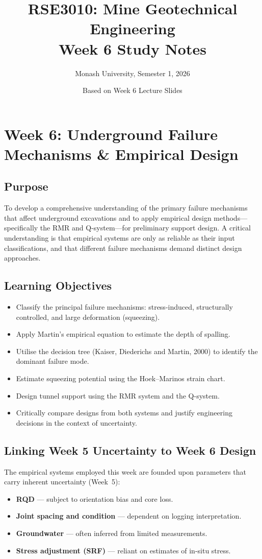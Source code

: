 \documentclass[a4paper,12pt]{article}
\title{\textbf{RSE3010: Mine Geotechnical Engineering}\\Week 6 Study Notes}
\author{Monash University, Semester 1, 2026}
\date{Based on Week 6 Lecture Slides}
\begin{document}
\maketitle

\section{Week 6: Underground Failure Mechanisms \& Empirical Design}

\subsection{Purpose}
To develop a comprehensive understanding of the primary failure mechanisms that affect underground excavations and to apply empirical design methods---specifically the RMR and Q-system---for preliminary support design. A critical understanding is that empirical systems are only as reliable as their input classifications, and that different failure mechanisms demand distinct design approaches.

\subsection{Learning Objectives}
\begin{itemize}
    \item Classify the principal failure mechanisms: stress-induced, structurally controlled, and large deformation (squeezing).
    \item Apply Martin's empirical equation to estimate the depth of spalling.
    \item Utilise the decision tree (Kaiser, Diederichs and Martin, 2000) to identify the dominant failure mode.
    \item Estimate squeezing potential using the Hoek--Marinos strain chart.
    \item Design tunnel support using the RMR system and the Q-system.
    \item Critically compare designs from both systems and justify engineering decisions in the context of uncertainty.
\end{itemize}

\subsection{Linking Week 5 Uncertainty to Week 6 Design}
The empirical systems employed this week are founded upon parameters that carry inherent uncertainty (Week~5):
\begin{itemize}
    \item \textbf{RQD} --- subject to orientation bias and core loss.
    \item \textbf{Joint spacing and condition} --- dependent on logging interpretation.
    \item \textbf{Groundwater} --- often inferred from limited measurements.
    \item \textbf{Stress adjustment (SRF)} --- reliant on estimates of in-situ stress.
\end{itemize}
\end{document}
